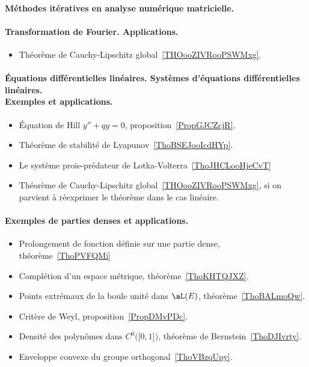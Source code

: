 \paragraph{Méthodes itératives en analyse numérique matricielle.}
\paragraph{Transformation de Fourier. Applications.}
\begin{itemize}
    \item Théorème de Cauchy-Lipschitz global~\ref{THOooZIVRooPSWMxg}.
\end{itemize}
\paragraph{Équations différentielles linéaires. Systèmes d’équations différentielles linéaires.\\ Exemples et applications.}
\begin{itemize}
    \item Équation de Hill \( y''+qy=0\), proposition~\ref{PropGJCZcjR}.
    \item Théorème de stabilité de Lyapunov~\ref{ThoBSEJooIcdHYp}.
    \item Le système proie-prédateur de Lotka-Volterra~\ref{ThoJHCLooHjeCvT}
    \item Théorème de Cauchy-Lipschitz global~\ref{THOooZIVRooPSWMxg}, si on parvient à réexprimer le théorème dans le cas linéaire.
\end{itemize}
\paragraph{Exemples de parties denses et applications.}
\begin{itemize}
    \item Prolongement de fonction définie sur une partie dense, théorème~\ref{ThoPVFQMi}
    \item Complétion d'un espace métrique, théorème~\ref{ThoKHTQJXZ}.
    \item Points extrémaux de la boule unité dans \( \aL(E)\), théorème~\ref{ThoBALmoQw}.
    \item Critère de Weyl, proposition~\ref{PropDMvPDc}.
    \item Densité des polynômes dans \( C^0\big( \mathopen[ 0 , 1 \mathclose] \big)\), théorème de Bernstein~\ref{ThoDJIvrty}.
    \item Enveloppe convexe du groupe orthogonal~\ref{ThoVBzqUpy}.
\end{itemize}
